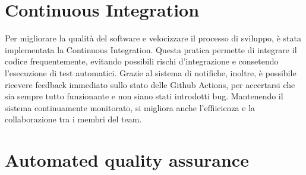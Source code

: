 





\section{Continuous Integration}
Per migliorare la qualità del software e velocizzare il processo di sviluppo, è stata implementata la Continuous Integration.
Questa pratica permette di integrare il codice frequentemente, evitando possibili rischi d'integrazione e consetendo 
l'esecuzione di test automatici. Grazie al sistema di notifiche, inoltre, è possibile ricevere feedback immediato sullo stato delle Github Actions,
per accertarsi che sia sempre tutto funzionante e non siano stati introdotti bug. Mantenendo il sistema continuamente monitorato,
si migliora anche l'effiicienza e la collaborazione tra i membri del team.

\section{Automated quality assurance}
